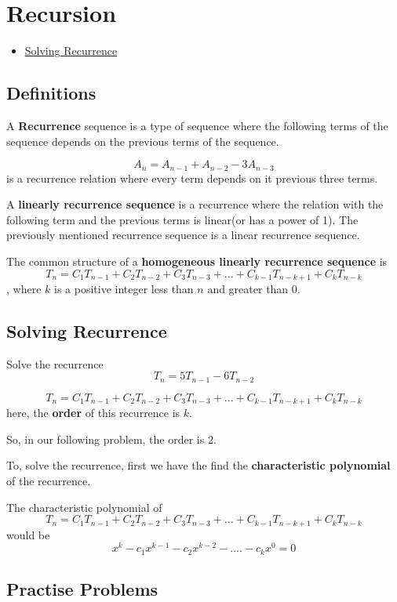 \chapter{Recursion}%

\begin{linkb}
   \begin{itemize}
        \item \href{https://www.youtube.com/watch?v=Jh8VFmv5_s4}{Solving Recurrence }
   \end{itemize}
\end{linkb}
\section{Definitions}
A \textbf{Recurrence} sequence is a type of sequence where the following terms of the sequence depends on the previous terms of the sequence.

$$A_n=A_{n-1}+A_{n-2}-3A_{n-3}$$ is a recurrence relation where every term depends on it previous three terms.

A \textbf{linearly recurrence sequence} is a recurrence where the relation with the following term and the previous terms is linear(or has a power of 1). The previously mentioned recurrence sequence is a linear recurrence sequence.

The common structure of a \textbf{homogeneous linearly recurrence sequence} is $$T_n=C_1T_{n-1}+C_2T_{n-2}+C_3T_{n-3}+...+C_{k-1}T_{n-k+1}+C_kT_{n-k}$$, where $k$ is a positive integer less than $n$ and greater than $0$.

\section{Solving Recurrence}
\begin{example}
Solve the recurrence $$T_n=5T_{n-1}-6T_{n-2}$$
\end{example}
$$T_n=C_1T_{n-1}+C_2T_{n-2}+C_3T_{n-3}+...+C_{k-1}T_{n-k+1}+C_kT_{n-k}$$ here, the \textbf{order} of this recurrence is $k$.

So, in our following problem, the order is 2.

To, solve the recurrence, first we have the find the \textbf{characteristic polynomial} of the recurrence.

The characteristic polynomial of $$T_n=C_1T_{n-1}+C_2T_{n-2}+C_3T_{n-3}+...+C_{k-1}T_{n-k+1}+C_kT_{n-k}$$ would be $$x^k-c_1x^{k-1}-c_2x^{k-2}-....-c_kx^{0}=0$$


\section{Practise Problems}